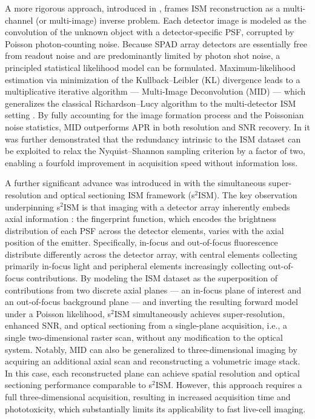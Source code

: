 \documentclass[letterpaper]{article}
\begin{document}
A more rigorous approach, introduced in \cite{castello2019robust,Zunino_2023}, frames ISM reconstruction as a multi-channel (or multi-image) inverse problem. Each detector image is modeled as the convolution of the unknown object with a detector-specific PSF, corrupted by Poisson photon-counting noise. Because SPAD array detectors are essentially free from readout noise and are predominantly limited by photon shot noise, a principled statistical likelihood model can be formulated. Maximum-likelihood estimation via minimization of the Kullback–Leibler (KL) divergence leads to a multiplicative iterative algorithm — Multi-Image Deconvolution (MID) — which generalizes the classical Richardson–Lucy algorithm to the multi-detector ISM setting \cite{Zunino_2023}. By fully accounting for the image formation process and the Poissonian noise statistics, MID outperforms APR in both resolution and SNR recovery. In \cite{Zunino_2023} it was further demonstrated that the redundancy intrinsic to the ISM dataset can be exploited to relax the Nyquist–Shannon sampling criterion by a factor of two, enabling a fourfold improvement in acquisition speed without information loss.

A further significant advance was introduced in \cite{s2ISM} with the simultaneous super-resolution and optical sectioning ISM framework (s$^2$ISM). The key observation underpinning s$^2$ISM is that imaging with a detector array inherently embeds axial information \cite{tortarolo2022focus}: the fingerprint function, which encodes the brightness distribution of each PSF across the detector elements, varies with the axial position of the emitter. Specifically, in-focus and out-of-focus fluorescence distribute differently across the detector array, with central elements collecting primarily in-focus light and peripheral elements increasingly collecting out-of-focus contributions. By modeling the ISM dataset as the superposition of contributions from two discrete axial planes — an in-focus plane of interest and an out-of-focus background plane — and inverting the resulting forward model under a Poisson likelihood, s$^2$ISM simultaneously achieves super-resolution, enhanced SNR, and optical sectioning from a single-plane acquisition, i.e., a single two-dimensional raster scan, without any modification to the optical system. 
Notably, MID can also be generalized to three-dimensional imaging by acquiring an additional axial scan and reconstructing a volumetric image stack. In this case, each reconstructed plane can achieve spatial resolution and optical sectioning performance comparable to s$^2$ISM. However, this approach requires a full three-dimensional acquisition, resulting in increased acquisition time and phototoxicity, which substantially limits its applicability to fast live-cell imaging.
\end{document}
